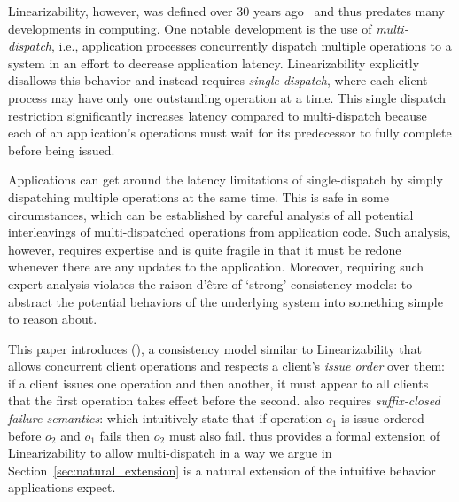 Linearizability, however, was defined over 30 years ago~\cite{herlihy1990linearizability,herlihy1987linearizability} and thus predates many developments in computing.
One notable development is the use of \textit{multi-dispatch}, i.e., application processes concurrently dispatch multiple operations to a system in an effort to
decrease application latency.
Linearizability explicitly disallows this behavior and instead requires \textit{single-dispatch}, where each client process may have only one outstanding operation at a time.
This single dispatch restriction significantly increases latency compared to multi-dispatch because each of an application's operations must wait for its predecessor to fully complete before being issued.

Applications can get around the latency limitations of single-dispatch by simply dispatching multiple operations at the same time.
This is safe in some circumstances, which can be established by careful analysis of all potential interleavings of multi-dispatched operations from application code.
Such analysis, however, requires expertise and is quite fragile in that it must be redone whenever there are any updates to the application.
Moreover, requiring such expert analysis violates the raison d'\^etre of `strong' consistency models:
to abstract the potential behaviors of the underlying system into something simple to reason about.






This paper introduces \mdllong{} (\mdl{}), a consistency model similar to Linearizability that allows concurrent client operations and respects a client's \textit{issue order} over them:
if a client issues one operation and then another, it must appear to all clients that the first operation takes effect before the second.
\mdl{} also requires \textit{suffix-closed failure semantics}:
which intuitively state that if operation $o_1$ is issue-ordered before $o_2$ and $o_1$ fails then $o_2$ must also fail.
\Mdl{} thus provides a formal extension of Linearizability to allow multi-dispatch in a way we argue in Section~\ref{sec:natural_extension} is a natural extension of the intuitive behavior applications expect.

